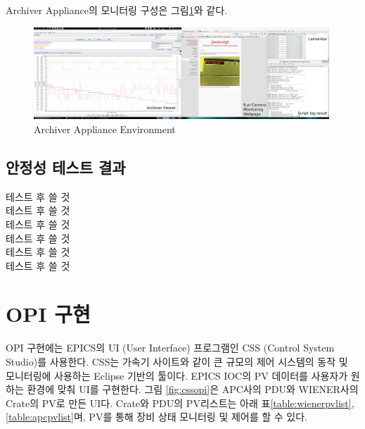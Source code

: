 \documentclass[11pt
  , a4paper
  , article
  , oneside
]{memoir}
\begin{document}
Archiver Appliance의 모니터링 구성은 그림\ref{fig:allscreen}와 같다. 

\begin{figure}[h!]
  \centering
  \includegraphics[width=0.99\textwidth]{./images/allscreen_2_comment.eps}
  \caption{Archiver Appliance Environment}
  \label{fig:allscreen}   
\end{figure}

\clearpage

\subsection{안정성 테스트 결과}

테스트 후 쓸 것\\
테스트 후 쓸 것\\
테스트 후 쓸 것\\
테스트 후 쓸 것\\
테스트 후 쓸 것\\
테스트 후 쓸 것\\


\section{OPI 구현}
OPI 구현에는 EPICS의 UI (User Interface) 프로그램인 CSS (Control System Studio)를 사용한다. CSS는 가속기 사이트와 같이 큰 규모의 제어 시스템의 동작 및 모니터링에 사용하는 Eclipse 기반의 툴이다\citep{css}. EPICS IOC의 PV 데이터를 사용자가 원하는 환경에 맞춰 UI를 구현한다. 그림 \ref{fig:cssopi}은 APC사의 PDU와 WIENER사의 Crate의 PV로 만든 UI다. Crate와 PDU의 PV리스트는 아래 표\ref{table:wienerpvlist}, \ref{table:apcpvlist}며, PV를 통해 장비 상태 모니터링 및 제어를 할 수 있다\cite{pvlist}.
\end{document}
